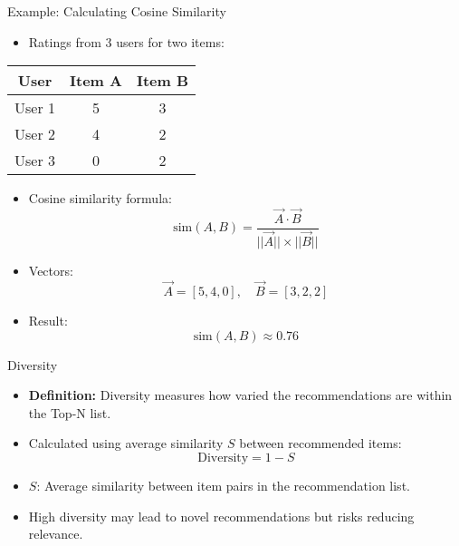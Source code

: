\documentclass{beamer}
\begin{document}
\begin{frame}{Example: Calculating Cosine Similarity}
\begin{itemize}
    \item Ratings from 3 users for two items:
\end{itemize}

\begin{center}
\begin{tabular}{|c|c|c|}
\hline
\textbf{User} & \textbf{Item A} & \textbf{Item B} \\ \hline
User 1 & 5 & 3 \\ \hline
User 2 & 4 & 2 \\ \hline
User 3 & 0 & 2 \\ \hline
\end{tabular}
\end{center}

\begin{itemize}
    \item Cosine similarity formula:
    \[
    \text{sim}(A,B) = \frac{\vec{A} \cdot \vec{B}}{||\vec{A}|| \times ||\vec{B}||}
    \]
    \item Vectors:
    \[
    \vec{A} = [5, 4, 0], \quad \vec{B} = [3, 2, 2]
    \]
    \item Result:
    \[
    \text{sim}(A,B) \approx 0.76
    \]
\end{itemize}
\end{frame}


\begin{frame}{Diversity}
\begin{itemize}
    \item \textbf{Definition:} Diversity measures how varied the recommendations are within the Top-N list.
    \item Calculated using average similarity \( S \) between recommended items:
    \[
    \text{Diversity} = 1 - S
    \]
    \item \( S \): Average similarity between item pairs in the recommendation list.
    \item High diversity may lead to novel recommendations but risks reducing relevance.
\end{itemize}
\end{frame}
\end{document}
